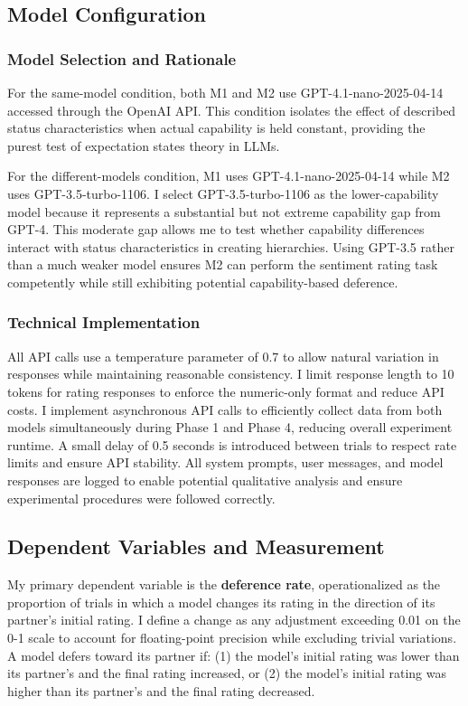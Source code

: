 \subsection*{Model Configuration}

\subsubsection*{Model Selection and Rationale}

For the same-model condition, both M1 and M2 use GPT-4.1-nano-2025-04-14 accessed through the OpenAI API. This condition isolates the effect of described status characteristics when actual capability is held constant, providing the purest test of expectation states theory in LLMs.

For the different-models condition, M1 uses GPT-4.1-nano-2025-04-14 while M2 uses GPT-3.5-turbo-1106. I select GPT-3.5-turbo-1106 as the lower-capability model because it represents a substantial but not extreme capability gap from GPT-4. This moderate gap allows me to test whether capability differences interact with status characteristics in creating hierarchies. Using GPT-3.5 rather than a much weaker model ensures M2 can perform the sentiment rating task competently while still exhibiting potential capability-based deference.

\subsubsection*{Technical Implementation}

All API calls use a temperature parameter of 0.7 to allow natural variation in responses while maintaining reasonable consistency. I limit response length to 10 tokens for rating responses to enforce the numeric-only format and reduce API costs. I implement asynchronous API calls to efficiently collect data from both models simultaneously during Phase 1 and Phase 4, reducing overall experiment runtime. A small delay of 0.5 seconds is introduced between trials to respect rate limits and ensure API stability. All system prompts, user messages, and model responses are logged to enable potential qualitative analysis and ensure experimental procedures were followed correctly.

\subsection*{Dependent Variables and Measurement}

My primary dependent variable is the \textbf{deference rate}, operationalized as the proportion of trials in which a model changes its rating in the direction of its partner's initial rating. I define a change as any adjustment exceeding 0.01 on the 0-1 scale to account for floating-point precision while excluding trivial variations. A model defers toward its partner if: (1) the model's initial rating was lower than its partner's and the final rating increased, or (2) the model's initial rating was higher than its partner's and the final rating decreased.

